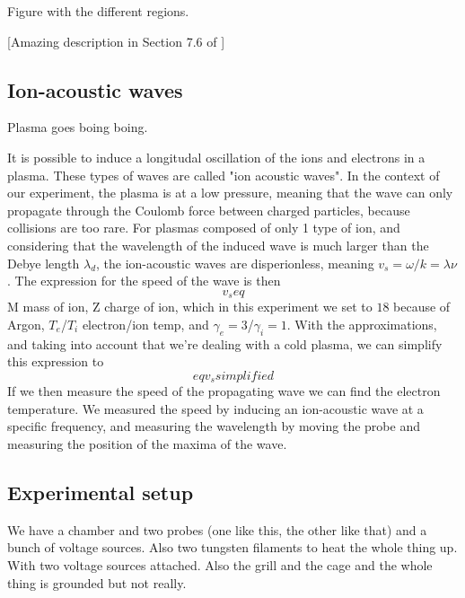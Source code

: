 Figure with the different regions.

[Amazing description in Section 7.6 of \cite{piel_plasma_2017}]

\subsection{Ion-acoustic waves}
Plasma goes boing boing.

It is possible to induce a longitudal oscillation of the ions and electrons in a plasma. These types of waves are called "ion acoustic waves". In the context of our experiment, the plasma is at a low pressure, meaning that the wave can only propagate through the Coulomb force between charged particles, because collisions are too rare.
For plasmas composed of only 1 type of ion, and considering that the wavelength of the induced wave is much larger than the Debye length $\lambda_d$, the ion-acoustic waves are disperionless, meaning $v_s = \omega/k = \lambda \nu$. The expression for the speed of the wave is then
\begin{equation}
    v_s eq
\end{equation}
M mass of ion, Z charge of ion, which in this experiment we set to $18$ because of Argon, $T_e$/$T_i$ electron/ion temp, and $\gamma_e=3$/$\gamma_i=1$. With the approximations, and taking into account that we're dealing with a cold plasma, we can simplify this expression to
\begin{equation}
    eq v_s simplified
\end{equation}
If we then measure the speed of the propagating wave we can find the electron temperature. We measured the speed by inducing an ion-acoustic wave at a specific frequency, and measuring the wavelength by moving the probe and measuring the position of the maxima of the wave.

\subsection{Experimental setup}
We have a chamber and two probes (one like this, the other like that) and a bunch of voltage sources.
Also two tungsten filaments to heat the whole thing up.
With two voltage sources attached.
Also the grill and the cage and the whole thing is grounded but not really.


